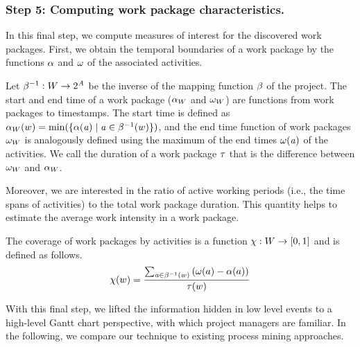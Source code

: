 \subsubsection{Step 5: Computing work package characteristics.} In this final step, we compute measures of interest for the discovered work packages. First, we obtain the temporal boundaries of a work package by the functions $\alpha$ and $\omega$ of the associated activities.

Let $\beta^{-1} : W \rightarrow 2^{\mathit{A}}$ be the inverse of the mapping function $\beta$ of the project.
The start and end time of a work package ($\alpha_{W}$ and $\omega_{W}$) are functions from work packages to timestamps. The start time is defined as $\alpha_{W}(w) = \min(\lbrace \alpha(\mathit{a}) \mid \mathit{a} \in \beta^{-1}(w)\rbrace )$, and the end time function of work packages $\omega_{W}$ is analogously defined using the maximum of the end times $\omega(\mathit{a})$ of the activities.
We call the duration of a work package $\tau$ that is the difference between $\omega_{W}$ and $\alpha_{W}$.

Moreover, we are interested in the ratio of active working periods (i.e., the time spans of activities) to the total work package duration. This quantity helps to estimate the average work intensity in a work package.

\begin{definition}[Coverage]
The coverage \coverage of work packages by activities is a function $\chi : W \rightarrow [0,1]$ and is defined as follows.
\begin{equation}
\chi(w) = \frac{\sum_{\mathit{a} \in \beta^{-1}(w)}  \left(\omega(a) - \alpha(a)\right)}{\tau(w)}
\end{equation}

\end{definition}

With this final step, we lifted the information hidden in low level events to a high-level Gantt chart perspective, with which project managers are familiar. In the following, we compare our technique to existing process mining approaches.



